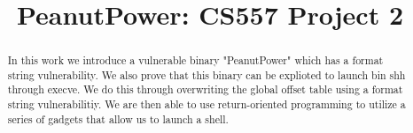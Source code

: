\documentclass[10pt, conference, letterpaper]{IEEEtran}
\begin{document}
\graphicspath{ {images/} }
\newcommand{\sysname}{ModiPick\xspace}
\newcommand{\Brittany}[1]{{\color{red}\textbf{Brittany: \textit{#1}}}}
\newcommand{\sam}[1]{{\color{blue}\textbf{Sam: \textit{#1}}}}
\newcommand{\eat}[1]{}



\title{PeanutPower: CS557 Project 2
}


\author{
\and
{}
}

\maketitle

\begin{abstract}
In this work we introduce a vulnerable binary "PeanutPower" which has a format string vulnerability. We also prove that this binary can be explioted to launch bin shh through execve. We do this through overwriting the global offset table using a format string vulnerabilitiy. We are then able to use return-oriented programming to utilize a series of gadgets that allow us to launch a shell.
\end{abstract}









%
%
\end{document}
